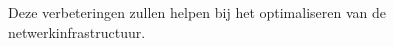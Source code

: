 \documentclass{hogent-article}
\begin{document}
Deze verbeteringen zullen helpen bij het optimaliseren van de netwerkinfrastructuur.





\end{document}
